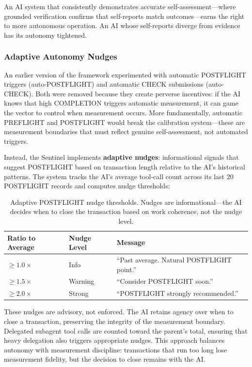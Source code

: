 An AI system that consistently demonstrates accurate self-assessment---where grounded verification confirms that self-reports match outcomes---earns the right to more autonomous operation. An AI whose self-reports diverge from evidence has its autonomy tightened.

\subsubsection{Adaptive Autonomy Nudges}

An earlier version of the framework experimented with automatic POSTFLIGHT triggers (auto-POSTFLIGHT) and automatic CHECK submissions (auto-CHECK). Both were removed because they create perverse incentives: if the AI knows that high COMPLETION triggers automatic measurement, it can game the vector to control when measurement occurs. More fundamentally, automatic PREFLIGHT and POSTFLIGHT would break the calibration system---these are measurement boundaries that must reflect genuine self-assessment, not automated triggers.

Instead, the Sentinel implements \textbf{adaptive nudges}: informational signals that suggest POSTFLIGHT based on transaction length relative to the AI's historical patterns. The system tracks the AI's average tool-call count across its last 20 POSTFLIGHT records and computes nudge thresholds:

\begin{table}[h]
\centering
\begin{tabular}{lll}
\toprule
\textbf{Ratio to Average} & \textbf{Nudge Level} & \textbf{Message} \\
\midrule
$\geq 1.0\times$ & Info & ``Past average. Natural POSTFLIGHT point.'' \\
$\geq 1.5\times$ & Warning & ``Consider POSTFLIGHT soon.'' \\
$\geq 2.0\times$ & Strong & ``POSTFLIGHT strongly recommended.'' \\
\bottomrule
\end{tabular}
\caption{Adaptive POSTFLIGHT nudge thresholds. Nudges are informational---the AI decides when to close the transaction based on work coherence, not the nudge level.}
\label{tab:nudge-thresholds}
\end{table}

These nudges are advisory, not enforced. The AI retains agency over when to close a transaction, preserving the integrity of the measurement boundary. Delegated subagent tool calls are counted toward the parent's total, ensuring that heavy delegation also triggers appropriate nudges. This approach balances autonomy with measurement discipline: transactions that run too long lose measurement fidelity, but the decision to close remains with the AI.

